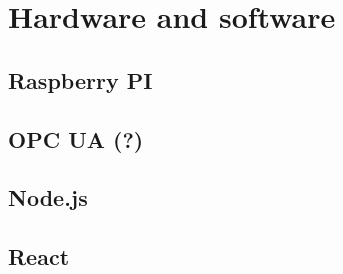 \chapter{Hardware and software}
\section{Raspberry PI}
\section{OPC UA (?)}
\section{Node.js}
\section{React}
